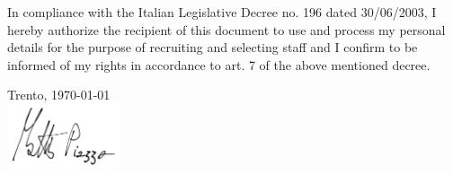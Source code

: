 \documentclass[9pt]{developercv} %
\begin{document}




In compliance with the Italian Legislative Decree no. 196 dated 30/06/2003, I hereby authorize the recipient of this document to use and process my personal details for the purpose of recruiting and selecting staff and I confirm to be informed of my rights in accordance to art. 7 of the above mentioned decree.

\vspace{0.5cm}
Trento, \today \\

\vspace{0.2cm}
\includegraphics[width=0.25\textwidth]{../shared/firma.jpg}
\end{document}
